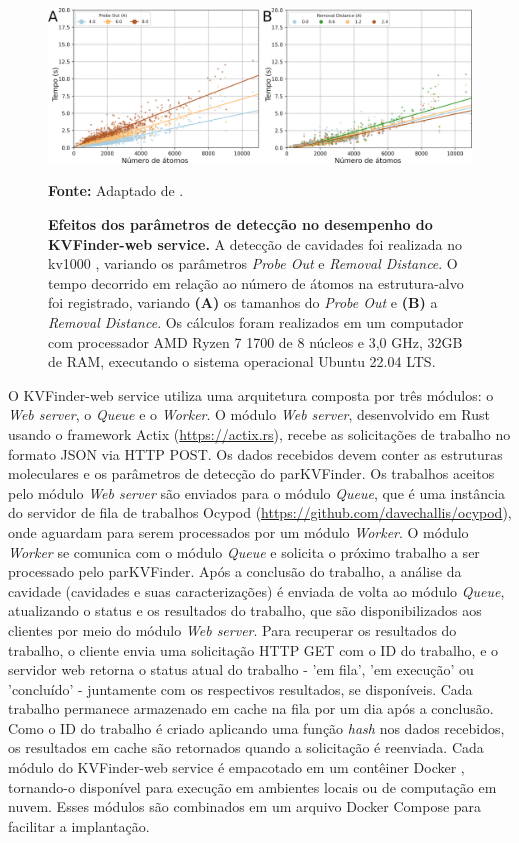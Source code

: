 \documentclass[Portugues]{phdquali}
\begin{document}
\begin{figure}[H]
  \centering
  \includegraphics[scale=1.5]{images/kvweb-performance.png}
  \centerline{\scriptsize{\textbf{Fonte:} Adaptado de \cite{guerra2023A}.}}
  \caption[Efeitos dos parâmetros de detecção no desempenho do KVFinder-web service]{\textbf{Efeitos dos parâmetros de detecção no desempenho do KVFinder-web service.} A detecção de cavidades foi realizada no kv1000 \cite{guerra2020}, variando os parâmetros \textit{Probe Out} e \textit{Removal Distance}. O tempo decorrido em relação ao número de átomos na estrutura-alvo foi registrado, variando \textbf{(A)} os tamanhos do \textit{Probe Out} e \textbf{(B)} a \textit{Removal Distance}. Os cálculos foram realizados em um computador com processador AMD Ryzen 7 1700 de 8 núcleos e 3,0 GHz, 32GB de RAM, executando o sistema operacional Ubuntu 22.04 LTS.}
  \label{fig:kvweb-performance}
\end{figure}

O KVFinder-web service utiliza uma arquitetura composta por três módulos: o \textit{Web server}, o \textit{Queue} e o \textit{Worker}. O módulo \textit{Web server}, desenvolvido em Rust usando o framework Actix (\url{https://actix.rs}), recebe as solicitações de trabalho no formato JSON via HTTP POST. Os dados recebidos devem conter as estruturas moleculares e os parâmetros de detecção do parKVFinder. Os trabalhos aceitos pelo módulo \textit{Web server} são enviados para o módulo \textit{Queue}, que é uma instância do servidor de fila de trabalhos Ocypod (\url{https://github.com/davechallis/ocypod}), onde aguardam para serem processados por um módulo \textit{Worker}. O módulo \textit{Worker} se comunica com o módulo \textit{Queue} e solicita o próximo trabalho a ser processado pelo parKVFinder. Após a conclusão do trabalho, a análise da cavidade (cavidades e suas caracterizações) é enviada de volta ao módulo \textit{Queue}, atualizando o status e os resultados do trabalho, que são disponibilizados aos clientes por meio do módulo \textit{Web server}. Para recuperar os resultados do trabalho, o cliente envia uma solicitação HTTP GET com o ID do trabalho, e o servidor web retorna o status atual do trabalho - 'em fila', 'em execução' ou 'concluído' - juntamente com os respectivos resultados, se disponíveis. Cada trabalho permanece armazenado em cache na fila por um dia após a conclusão. Como o ID do trabalho é criado aplicando uma função \textit{hash} nos dados recebidos, os resultados em cache são retornados quando a solicitação é reenviada. Cada módulo do KVFinder-web service é empacotado em um contêiner Docker \cite{docker}, tornando-o disponível para execução em ambientes locais ou de computação em nuvem. Esses módulos são combinados em um arquivo Docker Compose para facilitar a implantação.
\end{document}
